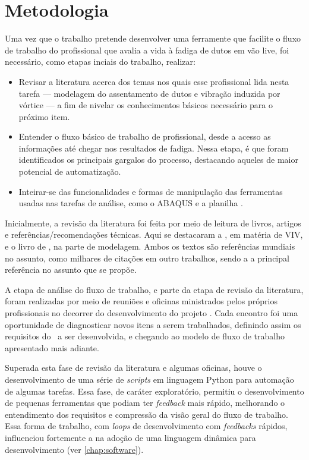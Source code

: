 \chapter{Metodologia}\label{chap:metodologia}


Uma vez que o trabalho pretende desenvolver uma ferramente que facilite o fluxo de trabalho do profissional que avalia a vida à fadiga de dutos em vão live, foi necessário, como etapas inciais do trabalho, realizar:

\begin{itemize}
    \item Revisar a literatura acerca dos temas nos quais esse profissional lida nesta tarefa --- modelagem do assentamento de dutos e vibração induzida por vórtice --- a fim de nivelar os conhecimentos básicos necessário para o próximo item.
    \item Entender o fluxo básico de trabalho de profissional, desde a acesso as informações até chegar nos resultados de fadiga. Nessa etapa, é que foram identificados os principais gargalos do processo, destacando aqueles de maior potencial de automatização.
    \item Inteirar-se das funcionalidades e formas de manipulação das ferramentas usadas nas tarefas de análise, como o ABAQUS e a planilha \fatfree.
\end{itemize}

Inicialmente, a revisão da literatura foi feita por meio de leitura de livros, artigos e referências/recomendações técnicas.
Aqui se destacaram a , em matéria de VIV, e o livro de , na parte de modelagem.
Ambos os textos são referências mundiais no assunto, como milhares de citações em outro trabalhos, sendo a  a principal referência no assunto que se propõe.

A etapa de análise do fluxo de trabalho, e parte da etapa de revisão da literatura, foram realizadas por meio de reuniões e oficinas ministrados pelos próprios profissionais no decorrer do desenvolvimento do projeto \integrispan.
Cada encontro foi uma oportunidade de diagnosticar novos itens a serem trabalhados, definindo assim os requisitos do \frame\  a ser desenvolvida, e chegando ao modelo de fluxo de trabalho apresentado mais adiante.

Superada esta fase de revisão da literatura e algumas oficinas, houve o desenvolvimento de uma série de \textit{scripts} em linguagem Python para automação de algumas tarefas.
Essa fase, de caráter exploratório, permitiu o desenvolvimento de pequenas ferramentas que podiam ter \textit{feedback} mais rápido, melhorando o entendimento dos requisitos e compressão da visão geral do fluxo de trabalho.
Essa forma de trabalho, com \textit{loops} de desenvolvimento com \textit{feedbacks} rápidos, influenciou fortemente a na adoção de uma linguagem dinâmica para desenvolvimento (ver \autoref{chap:software}).

